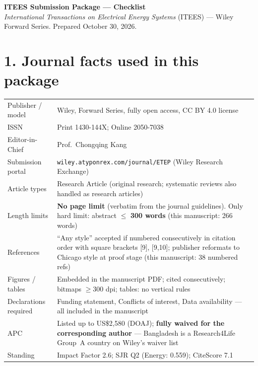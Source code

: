 \documentclass[11pt,a4paper]{article}
\begin{document}
{\LARGE\bfseries\color{acc} ITEES Submission Package --- Checklist}\\[2pt]
{\small\textit{International Transactions on Electrical Energy Systems} (ITEES) --- Wiley Forward Series.
Prepared October 30, 2026.}

\section*{1. Journal facts used in this package}
\begin{tabular}{@{}>{\raggedright\arraybackslash}p{4.6cm}p{11.6cm}@{}}
\toprule
Publisher / model & Wiley, Forward Series, fully open access, CC BY 4.0 license \\
ISSN & Print 1430-144X; Online 2050-7038 \\
Editor-in-Chief & Prof.\ Chongqing Kang \\
Submission portal & \texttt{wiley.atyponrex.com/journal/ETEP} (Wiley Research Exchange) \\
Article types & Research Article (original research; systematic reviews also handled as research articles) \\
Length limits & \textbf{No page limit} (verbatim from the journal guidelines). Only hard limit: abstract $\le$ \textbf{300 words} (this manuscript: 266 words) \\
References & ``Any style'' accepted if numbered consecutively in citation order with square brackets [9], [9,10]; publisher reformats to Chicago style at proof stage (this manuscript: 38 numbered refs) \\
Figures / tables & Embedded in the manuscript PDF; cited consecutively; bitmaps $\ge$300 dpi; tables: no vertical rules \\
Declarations required & Funding statement, Conflicts of interest, Data availability --- all included in the manuscript \\
APC & Listed up to US\$2{,}580 (DOAJ); \textbf{fully waived for the corresponding author} --- Bangladesh is a Research4Life Group~A country on Wiley's waiver list \\
Standing & Impact Factor 2.6; SJR Q2 (Energy: 0.559); CiteScore 7.1 \\
\bottomrule
\end{tabular}
\end{document}
